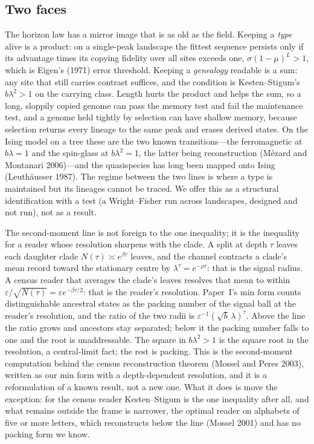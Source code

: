 \documentclass[11pt]{article}
\begin{document}
\subsection{Two faces}

The horizon law has a mirror image that is as old as the field. Keeping a \emph{type} alive is a product: on a single-peak landscape the fittest sequence persists only if its advantage times its copying fidelity over all sites exceeds one, $\sigma(1-\mu)^L>1$, which is Eigen's (1971) error threshold. Keeping a \emph{genealogy} readable is a sum: any site that still carries contrast suffices, and the condition is Kesten--Stigum's $b\lambda^2>1$ on the carrying class. Length hurts the product and helps the sum, so a long, sloppily copied genome can pass the memory test and fail the maintenance test, and a genome held tightly by selection can have shallow memory, because selection returns every lineage to the same peak and erases derived states. On the Ising model on a tree these are the two known transitions---the ferromagnetic at $b\lambda=1$ and the spin-glass at $b\lambda^2=1$, the latter being reconstruction (M\'ezard and Montanari 2006)---and the quasispecies has long been mapped onto Ising (Leuth\"ausser 1987). The regime between the two lines is where a type is maintained but its lineages cannot be traced. We offer this as a structural identification with a test (a Wright--Fisher run across landscapes, designed and not run), not as a result.

The second-moment line is not foreign to the one inequality; it is the inequality for a reader whose resolution sharpens with the clade. A split at depth $\tau$ leaves each daughter clade $N(\tau)\asymp e^{\beta\tau}$ leaves, and the channel contracts a clade's mean record toward the stationary centre by $\lambda^\tau=e^{-\rho\tau}$: that is the signal radius. A census reader that averages the clade's leaves resolves that mean to within $\varepsilon/\sqrt{N(\tau)}=\varepsilon e^{-\beta\tau/2}$: that is the reader's resolution. Paper~I's min form counts distinguishable ancestral states as the packing number of the signal ball at the reader's resolution, and the ratio of the two radii is $\varepsilon^{-1}(\sqrt b\,\lambda)^{\tau}$. Above the line the ratio grows and ancestors stay separated; below it the packing number falls to one and the root is unaddressable. The square in $b\lambda^2>1$ is the square root in the resolution, a central-limit fact; the rest is packing. This is the second-moment computation behind the census reconstruction theorem (Mossel and Peres 2003), written as our min form with a depth-dependent resolution, and it is a reformulation of a known result, not a new one. What it does is move the exception: for the census reader Kesten--Stigum is the one inequality after all, and what remains outside the frame is narrower, the optimal reader on alphabets of five or more letters, which reconstructs below the line (Mossel 2001) and has no packing form we know.
\end{document}
